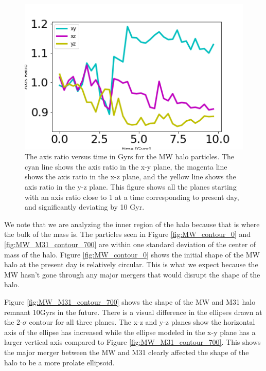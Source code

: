 \documentclass[linenumbers, twocolumn]{aastex631}
\begin{document}
\begin{figure}[ht]
    \centering
    \includegraphics[scale=0.5]{figures/AR_plot.png}
    \caption{The axis ratio versus time in Gyrs for the MW halo particles. The cyan line shows the axis ratio in the x-y plane, the magenta line shows the axis ratio in the x-z plane, and the yellow line shows the axis ratio in the y-z plane. This figure shows all the planes starting with an axis ratio close to 1 at a time corresponding to present day, and significantly deviating by 10 Gyr.}
    \label{fig:AR_evol}
\end{figure}

We note that we are analyzing the inner region of the halo because that is where the bulk of the mass is. The particles seen in Figure \ref{fig:MW_contour_0} and \ref{fig:MW_M31_contour_700} are within one standard deviation of the center of mass of the halo.
Figure \ref{fig:MW_contour_0} shows the initial shape of the MW halo at the present day is relatively circular. This is what we expect because the MW hasn't gone through any major mergers that would disrupt the shape of the halo. 

Figure \ref{fig:MW_M31_contour_700} shows the shape of the MW and M31 halo remnant 10Gyrs in the future. There is a visual difference in the ellipses drawn at the 2-$\sigma$ contour for all three planes. The x-z and y-z planes show the horizontal axis of the ellipse has increased while the ellipse modeled in the x-y plane has a larger vertical axis compared to Figure \ref{fig:MW_M31_contour_700}. This shows the major merger between the MW and M31 clearly affected the shape of the halo to be a more prolate ellipsoid.
\end{document}
